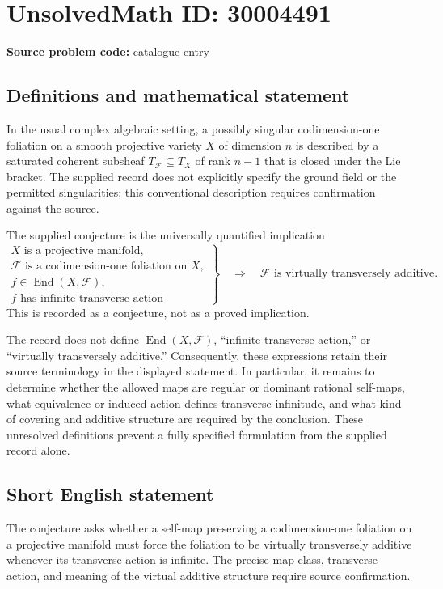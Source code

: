 \documentclass[11pt]{article}
\begin{document}
\section*{UnsolvedMath ID: 30004491}
\textbf{Source problem code:} catalogue entry
\subsection{Definitions and mathematical statement}
In the usual complex algebraic setting, a possibly singular codimension-one foliation on a smooth projective variety \(X\) of dimension \(n\) is described by a saturated coherent subsheaf \(T_{\mathcal F}\subseteq T_X\) of rank \(n-1\) that is closed under the Lie bracket. The supplied record does not explicitly specify the ground field or the permitted singularities; this conventional description requires confirmation against the source.

The supplied conjecture is the universally quantified implication
\[
\left.
\begin{gathered}
X\text{ is a projective manifold},\\
\mathcal F\text{ is a codimension-one foliation on }X,\\
f\in\operatorname{End}(X,\mathcal F),\\
f\text{ has infinite transverse action}
\end{gathered}
\right\}
\quad\Longrightarrow\quad
\mathcal F\text{ is virtually transversely additive}.
\]
This is recorded as a conjecture, not as a proved implication.

The record does not define \(\operatorname{End}(X,\mathcal F)\), ``infinite transverse action,'' or ``virtually transversely additive.'' Consequently, these expressions retain their source terminology in the displayed statement. In particular, it remains to determine whether the allowed maps are regular or dominant rational self-maps, what equivalence or induced action defines transverse infinitude, and what kind of covering and additive structure are required by the conclusion. These unresolved definitions prevent a fully specified formulation from the supplied record alone.
\subsection{Short English statement}
The conjecture asks whether a self-map preserving a codimension-one foliation on a projective manifold must force the foliation to be virtually transversely additive whenever its transverse action is infinite. The precise map class, transverse action, and meaning of the virtual additive structure require source confirmation.
\end{document}
